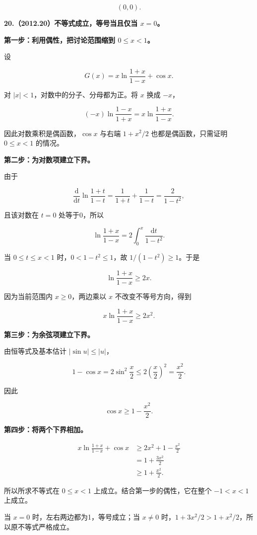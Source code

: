 \documentclass[UTF8,11pt,fontset=windows]{ctexart}
\begin{document}
$$
(0,0).
$$

\clearpage

\textbf{20.（2012.20）不等式成立，等号当且仅当 $x=0$。}

\textbf{第一步：利用偶性，把讨论范围缩到 $0\le x<1$。}

设

$$
G(x)=x\ln\frac{1+x}{1-x}+\cos x.
$$

对 $|x|<1$，对数中的分子、分母都为正。将 $x$ 换成 $-x$，

$$
(-x)\ln\frac{1-x}{1+x}
=x\ln\frac{1+x}{1-x}.
$$

因此对数乘积是偶函数，$\cos x$ 与右端 $1+x^2/2$ 也都是偶函数，只需证明 $0\le x<1$ 的情况。

\textbf{第二步：为对数项建立下界。}

由于

$$
\frac{\mathrm d}{\mathrm dt}\ln\frac{1+t}{1-t}
=\frac1{1+t}+\frac1{1-t}
=\frac2{1-t^2},
$$

且该对数在 $t=0$ 处等于0，所以

$$
\ln\frac{1+x}{1-x}
=2\int_0^x\frac{\mathrm dt}{1-t^2}.
$$

当 $0\le t\le x<1$ 时，$0<1-t^2\le1$，故 $1/(1-t^2)\ge1$。于是

$$
\ln\frac{1+x}{1-x}\ge2x.
$$

因为当前范围内 $x\ge0$，两边乘以 $x$ 不改变不等号方向，得到

$$
x\ln\frac{1+x}{1-x}\ge2x^2.
$$

\textbf{第三步：为余弦项建立下界。}

由恒等式及基本估计 $|\sin u|\le|u|$，

$$
1-\cos x=2\sin^2\frac x2
\le2\left(\frac x2\right)^2
=\frac{x^2}{2}.
$$

因此

$$
\cos x\ge1-\frac{x^2}{2}.
$$

\textbf{第四步：将两个下界相加。}

$$
\begin{aligned}
x\ln\frac{1+x}{1-x}+\cos x
&\ge2x^2+1-\frac{x^2}{2}\\
&=1+\frac{3x^2}{2}\\
&\ge1+\frac{x^2}{2}.
\end{aligned}
$$

所以所求不等式在 $0\le x<1$ 上成立。结合第一步的偶性，它在整个 $-1<x<1$ 上成立。

当 $x=0$ 时，左右两边都为1，等号成立；当 $x\ne0$ 时，$1+3x^2/2>1+x^2/2$，所以原不等式严格成立。
\end{document}
